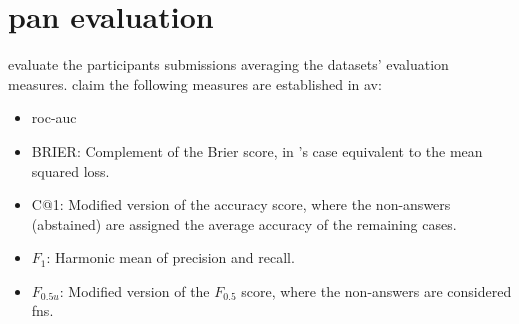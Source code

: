 \section{\acs{pan} evaluation}
\label{sec:pan_evaluation}

\citet{ayele_overview_2024,bevendorff_overview_2024} evaluate the participants submissions averaging the datasets' evaluation measures.
\citet{ayele_overview_2024} claim the following measures are established in \ac{av}:
\begin{itemize}
    \item \ac{roc-auc}
    \item BRIER: Complement of the Brier score, in \citet{bevendorff_overview_2024}'s case equivalent to the mean squared loss.
    \item C@1: Modified version of the accuracy score, where the non-answers (abstained) are assigned the average accuracy of the remaining cases.
    \item $F_1$: Harmonic mean of precision and recall.
    \item $F_{0.5u}$: Modified version of the $F_{0.5}$ score, where the non-answers are considered \acp{fn}.
\end{itemize}